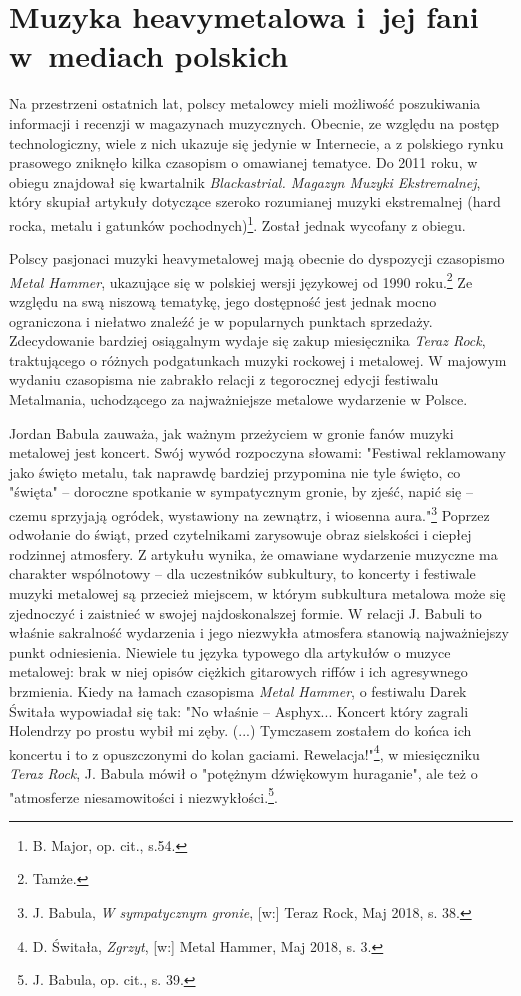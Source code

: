 \documentclass[12pt, a4paper, titlepage]{report}
\begin{document}
\section{Muzyka heavymetalowa i~jej fani w~mediach polskich}
Na przestrzeni ostatnich lat, polscy metalowcy mieli możliwość poszukiwania informacji i recenzji w magazynach muzycznych. Obecnie, ze względu na postęp technologiczny, wiele z nich ukazuje się jedynie w Internecie, a z polskiego rynku prasowego zniknęło kilka czasopism o omawianej tematyce. Do 2011 roku, w obiegu znajdował się kwartalnik \textit{Blackastrial. Magazyn Muzyki Ekstremalnej}, który skupiał artykuły dotyczące szeroko rozumianej muzyki ekstremalnej (hard rocka, metalu i gatunków pochodnych)\footnote{B. Major, op. cit., s.54.}. Został jednak wycofany z obiegu.

Polscy pasjonaci muzyki heavymetalowej mają obecnie do dyspozycji czasopismo \textit{Metal Hammer}, ukazujące się w polskiej wersji językowej od 1990 roku.\footnote{Tamże.} Ze względu na swą niszową tematykę, jego dostępność jest jednak mocno ograniczona i niełatwo znaleźć je w popularnych punktach sprzedaży. Zdecydowanie bardziej osiągalnym wydaje się zakup miesięcznika \textit{Teraz Rock}, traktującego o różnych podgatunkach muzyki rockowej i metalowej. W majowym wydaniu czasopisma nie zabrakło relacji z tegorocznej edycji festiwalu Metalmania, uchodzącego za najważniejsze metalowe wydarzenie w Polsce.

Jordan Babula zauważa, jak ważnym przeżyciem w gronie fanów muzyki metalowej jest koncert. Swój wywód rozpoczyna słowami: "Festiwal reklamowany jako święto metalu, tak naprawdę bardziej przypomina nie tyle święto, co "święta" -- doroczne spotkanie w sympatycznym gronie, by zjeść, napić się -- czemu sprzyjają ogródek, wystawiony na zewnątrz, i wiosenna aura."\footnote{J. Babula, \textit{W sympatycznym gronie}, [w:] Teraz Rock, Maj 2018, s. 38.} Poprzez odwołanie do świąt, przed czytelnikami zarysowuje obraz sielskości i ciepłej rodzinnej atmosfery. Z artykułu wynika, że omawiane wydarzenie muzyczne ma charakter wspólnotowy -- dla uczestników subkultury, to koncerty i festiwale muzyki metalowej są przecież miejscem, w którym subkultura metalowa może się zjednoczyć i zaistnieć w swojej najdoskonalszej formie. W relacji J. Babuli to właśnie sakralność wydarzenia i jego niezwykła atmosfera stanowią najważniejszy punkt odniesienia. Niewiele tu języka typowego dla artykułów o muzyce metalowej: brak w niej opisów ciężkich gitarowych riffów i ich agresywnego brzmienia. Kiedy na łamach czasopisma \textit{Metal Hammer}, o festiwalu Darek Świtała wypowiadał się tak: "No właśnie – Asphyx... Koncert który zagrali Holendrzy po prostu wybił mi zęby. (...) Tymczasem zostałem do końca ich koncertu i to z opuszczonymi do kolan gaciami. Rewelacja!"\footnote{D. Świtała, \textit{Zgrzyt}, [w:] Metal Hammer, Maj 2018, s. 3.}, w miesięczniku \textit{Teraz Rock}, J. Babula mówił o "potężnym dźwiękowym huraganie", ale też o "atmosferze niesamowitości i niezwykłości.\footnote{J. Babula, op. cit., s. 39.}.
\end{document}
